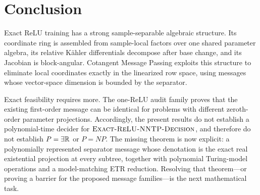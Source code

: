 \section{Conclusion}
\label{sec:conclusion}

Exact ReLU training has a strong sample-separable algebraic structure.  Its
coordinate ring is assembled from sample-local factors over one shared
parameter algebra, its relative K\"ahler differentials decompose after base
change, and its Jacobian is block-angular.  Cotangent Message Passing exploits
this structure to eliminate local coordinates exactly in the linearized row
space, using messages whose vector-space dimension is bounded by the separator.

Exact feasibility requires more.  The one-ReLU audit family proves that the
existing first-order message can be identical for problems with different
zeroth-order parameter projections.  Accordingly, the present results do not
establish a polynomial-time decider for \(\textnormal{\textsc{Exact-ReLU-NNTP-Decision}}\), and therefore do not
establish \(P=\exists\mathbb{R}\) or \(P=NP\).  The missing theorem is now explicit: a
polynomially represented separator message whose denotation is the exact real
existential projection at every subtree, together with polynomial Turing-model
operations and a model-matching ETR reduction.  Resolving that theorem---or
proving a barrier for the proposed message families---is the next mathematical
task.
